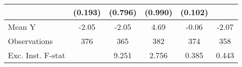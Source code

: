 {\begin{tabular}{l*{5}{c}}
            &     (0.193)         &     (0.796)         &     (0.990)         &     (0.102)         &                     \\
\midrule
Mean Y      &       -2.05         &       -2.05         &        4.69         &       -0.06         &       -2.07         \\
Observations&         376         &         365         &         382         &         374         &         358         \\
Exc. Inst. F-stat&                     &       9.251         &       2.756         &       0.385         &       0.443         \\
\bottomrule
\end{tabular}
}
